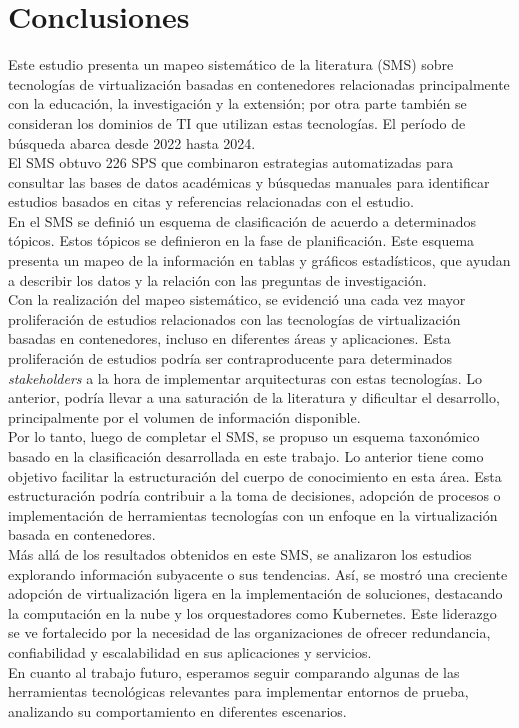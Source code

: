 \section{Conclusiones}
Este estudio presenta un mapeo sistemático de la literatura (SMS) sobre tecnologías de virtualización basadas en contenedores relacionadas principalmente con la educación, la investigación y la extensión; por otra parte también se consideran los dominios de TI que utilizan estas tecnologías. El período de búsqueda abarca desde 2022 hasta 2024.\\
El SMS obtuvo 226 SPS que combinaron estrategias automatizadas para consultar las bases de datos académicas y búsquedas manuales para identificar estudios basados en citas y referencias relacionadas con el estudio.\\
En el SMS se definió un esquema de clasificación de acuerdo a determinados tópicos. Estos tópicos se definieron en la fase de planificación. Este esquema presenta un mapeo de la información en tablas y gráficos estadísticos, que ayudan a describir los datos y la relación con las preguntas de investigación.\\
Con la realización del mapeo sistemático, se evidenció una cada vez mayor proliferación de estudios relacionados con las tecnologías de virtualización basadas en contenedores, incluso en diferentes áreas y aplicaciones. Esta proliferación de estudios podría ser contraproducente para determinados \textit{stakeholders} a la hora de implementar arquitecturas con estas tecnologías. Lo anterior, podría llevar a una saturación de la literatura y dificultar el desarrollo, principalmente por el volumen de información disponible. \\
Por lo tanto, luego de completar el SMS, se propuso un esquema taxonómico basado en la clasificación desarrollada en este trabajo. Lo anterior tiene como objetivo facilitar la estructuración del cuerpo de conocimiento en esta área. Esta estructuración podría contribuir a la toma de decisiones, adopción de procesos o implementación de herramientas tecnologías con un enfoque en la virtualización basada en contenedores. \\
Más allá de los resultados obtenidos en este SMS, se analizaron los estudios explorando información subyacente o sus tendencias. Así, se mostró una creciente adopción de virtualización ligera en la implementación de soluciones, destacando la computación en la nube y los orquestadores como Kubernetes. Este liderazgo se ve fortalecido por la necesidad de las organizaciones de ofrecer redundancia, confiabilidad y escalabilidad en sus aplicaciones y servicios.\\
En cuanto al trabajo futuro, esperamos seguir comparando algunas de las herramientas tecnológicas relevantes para implementar entornos de prueba, analizando su comportamiento en diferentes escenarios.